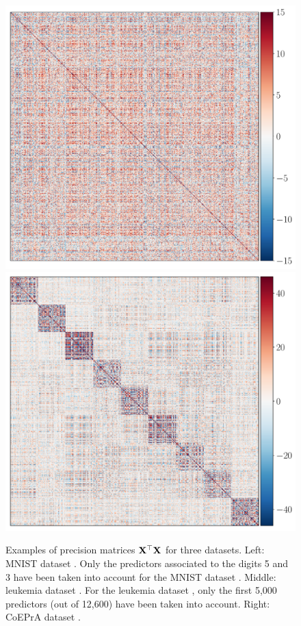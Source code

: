 \documentclass[nohypdvips,onefignum,onetabnum]{siamart171218}
\begin{document}
\begin{example}
\begin{figure}
  \mbox{{\includegraphics[scale=0.18]{images/Armstrong_AA.pdf}}}
  \mbox{{\includegraphics[scale=0.18]{images/Coepra_AA.pdf}}}
  \caption{Examples of precision matrices $\mathbf{X}^{\top}\mathbf{X}$ for three datasets.
  Left: MNIST dataset \cite{LeCun1998}. Only the predictors associated to the digits 5 and 3 have been taken into account for the MNIST dataset \cite{LeCun1998}.
  Middle: leukemia dataset \cite{Armstrong2002}. For the leukemia dataset \cite{Armstrong2002}, only the first 5,000 predictors (out of 12,600) have been taken into account.
  Right: CoEPrA dataset \cite{CoEPrA}.}
  \label{fig:LASSO_example}
  \end{figure}
\end{example}
\end{document}
